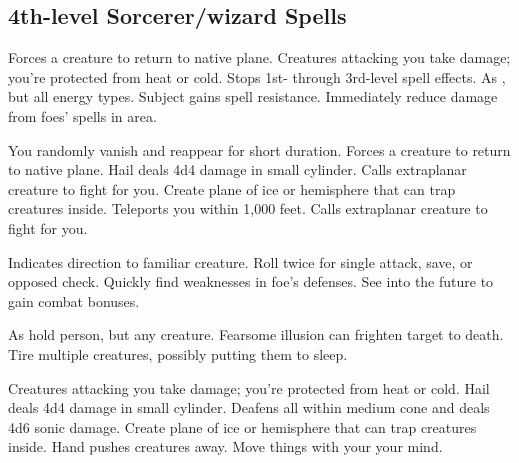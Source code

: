 \subsection{4th-level Sorcerer/wizard Spells} 
\begin{swspelllist}
   Forces a creature to return to native plane.
   Creatures attacking you take damage; you're protected from heat or cold.
   Stops 1st- through 3rd-level spell effects.
   As , but all energy types.
   Subject gains spell resistance.
   Immediately reduce damage from foes' spells in area.
  \spellheadrestricted{}

   You randomly vanish and reappear for short duration.
   Forces a creature to return to native plane.
   Hail deals 4d4 damage in small cylinder.
   Calls extraplanar creature to fight for you.
   Create plane of ice or hemisphere that can trap creatures inside.
   Teleports you within 1,000 feet.
   Calls extraplanar creature to fight for you.

   Indicates direction to familiar creature.
   Roll twice for single attack, save, or opposed check.
   Quickly find weaknesses in foe's defenses.
   See into the future to gain combat bonuses.

   As hold person, but any creature.
   Fearsome illusion can frighten target to death.
   Tire multiple creatures, possibly putting them to sleep.
  \spellheadrestricted{}
  \spellheadrestricted{}

   Creatures attacking you take damage; you're protected from heat or cold.
   Hail deals 4d4 damage in small cylinder.
   Deafens all within medium cone and deals 4d6 sonic damage.
   Create plane of ice or hemisphere that can trap creatures inside.
   Hand pushes creatures away.
   Move things with your your mind.


\end{swspelllist}
